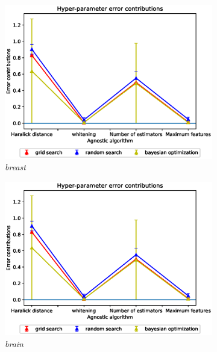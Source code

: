 \begin{figure}[ht!]
\centering
\begin{subfigure}{.5\textwidth}
  \centering
  \includegraphics[scale=0.37]{img/EP/agnostic_error_hyper_breast.eps}
  \caption{\textit{breast}}
  \label{fig:sfig1}
\end{subfigure}%
\begin{subfigure}{.5\textwidth}
  \centering
  \includegraphics[scale=0.37]{img/EP/agnostic_error_hyper_breast.eps}
  \caption{\textit{brain}}
  \label{fig:sfig2}
\end{subfigure}
\begin{subfigure}{.5\textwidth}

\end{subfigure}
\end{figure}
